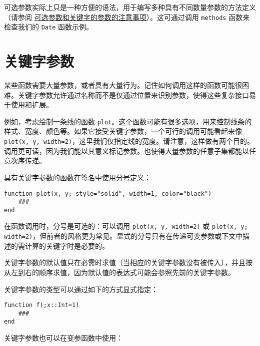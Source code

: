 可选参数实际上只是一种方便的语法，用于编写多种具有不同数量参数的方法定义（请参阅 \hyperlink{15680937628543940678}{可选参数和关键字的参数的注意事项}）。这可通过调用 \texttt{methods} 函数来检查我们的 \texttt{Date} 函数示例。



\hypertarget{8084690442149965313}{}


\section{关键字参数}



某些函数需要大量参数，或者具有大量行为。记住如何调用这样的函数可能很困难。关键字参数允许通过名称而不是仅通过位置来识别参数，使得这些复杂接口易于使用和扩展。



例如，考虑绘制一条线的函数 \texttt{plot}。这个函数可能有很多选项，用来控制线条的样式、宽度、颜色等。如果它接受关键字参数，一个可行的调用可能看起来像 \texttt{plot(x, y, width=2)}，这里我们仅指定线的宽度。请注意，这样做有两个目的。调用更可读，因为我们能以其意义标记参数。也使得大量参数的任意子集都能以任意次序传递。



具有关键字参数的函数在签名中使用分号定义：




\begin{verbatim}
function plot(x, y; style="solid", width=1, color="black")
    ###
end
\end{verbatim}



在函数调用时，分号是可选的：可以调用 \texttt{plot(x, y, width=2)} 或 \texttt{plot(x, y; width=2)}，但前者的风格更为常见。显式的分号只有在传递可变参数或下文中描述的需计算的关键字时是必要的。



关键字参数的默认值只在必需时求值（当相应的关键字参数没有被传入），并且按从左到右的顺序求值，因为默认值的表达式可能会参照先前的关键字参数。



关键字参数的类型可以通过如下的方式显式指定：




\begin{verbatim}
function f(;x::Int=1)
    ###
end
\end{verbatim}



关键字参数也可以在变参函数中使用：




